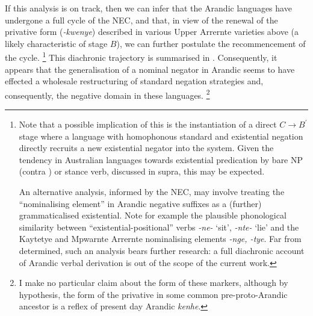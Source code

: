 \documentclass[output=paper]{langsci/langscibook}
\begin{document}
If this analysis is on track, then we can
infer that the Arandic languages have undergone a full cycle of the NEC,
and that, in view of the renewal of the privative form (\textit{-kwenye})
described in various Upper Arrernte varieties above (a likely
characteristic of stage $B$), we can further postulate the recommencement
of the cycle.%
%
\footnote{Note that a possible implication of this is the instantiation of
a direct $C\to B^\prime$ stage where a language with homophonous standard
and existential negation directly recruits a new existential negator into
the system. Given the tendency in Australian languages towards existential
predication by bare NP (contra \citealt{Croft1991}) or stance verb,
discussed in  supra, this may be expected.
	
An alternative analysis, informed by the NEC, may involve treating the
``nominalising element'' in Arandic negative suffixes as a (further)
grammaticalised existential. Note for example the plausible phonological
similarity between ``existential-positional'' verbs \textit{-ne-} `sit',
\textit{-nte-} `lie' and the Kaytetye and Mpwarnte
Arrernte nominalising elements \textit{-nge, -tye}. Far from determined, such an analysis bears further research: a full diachronic account of Arandic verbal derivation is out of the scope of the current work.} 
%
This diachronic trajectory is summarised in . 
Consequently, it appears that the generalisation of a nominal negator in
Arandic seems to have effected a wholesale restructuring of standard
negation strategies and, consequently, the negative domain in these
languages.%
%
\footnote{I make no particular claim about the form of these markers, although by hypothesis, the form of the privative in some common pre-proto-Arandic ancestor is a reflex of present day Arandic \textit{\textdblhyphen kenhe}.}
%
\end{document}
